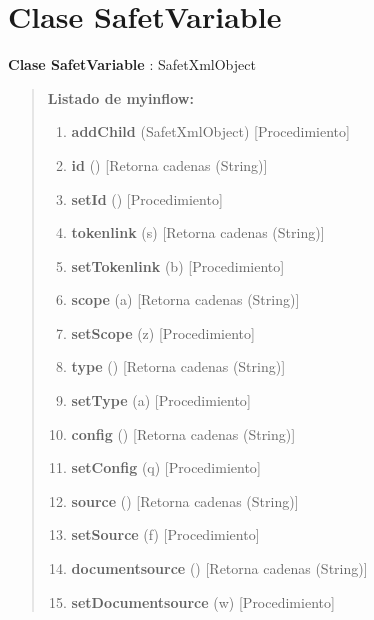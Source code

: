 \documentclass[letterpaper,11pt,spanish]{sphinxmanual}
\begin{document}
\chapter{Clase SafetVariable}
\label{_templates/Contenido5/Clase4::doc}\label{_templates/Contenido5/Clase4:clase-safetvariable}
\textbf{Clase SafetVariable} : SafetXmlObject
\begin{quote}

\textbf{Listado de myinflow:}
\begin{enumerate}
\item {} 
\textbf{addChild} (SafetXmlObject) {[}Procedimiento{]}

\item {} 
\textbf{id} () {[}Retorna cadenas (String){]}

\item {} 
\textbf{setId} () {[}Procedimiento{]}

\item {} 
\textbf{tokenlink} (s) {[}Retorna cadenas (String){]}

\item {} 
\textbf{setTokenlink} (b) {[}Procedimiento{]}

\item {} 
\textbf{scope} (a) {[}Retorna cadenas (String){]}

\item {} 
\textbf{setScope} (z) {[}Procedimiento{]}

\item {} 
\textbf{type} () {[}Retorna cadenas (String){]}

\item {} 
\textbf{setType} (a) {[}Procedimiento{]}

\item {} 
\textbf{config} () {[}Retorna cadenas (String){]}

\item {} 
\textbf{setConfig} (q) {[}Procedimiento{]}

\item {} 
\textbf{source} () {[}Retorna cadenas (String){]}

\item {} 
\textbf{setSource} (f) {[}Procedimiento{]}

\item {} 
\textbf{documentsource} () {[}Retorna cadenas (String){]}

\item {} 
\textbf{setDocumentsource} (w) {[}Procedimiento{]}


\end{enumerate}
\end{quote}
\end{document}
